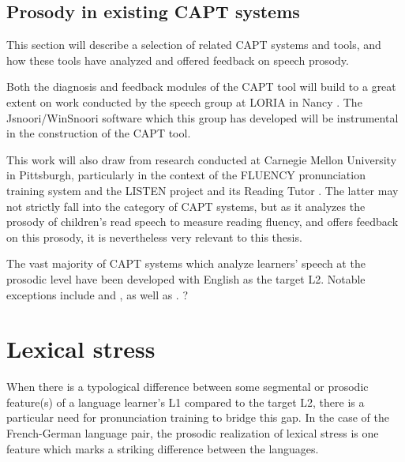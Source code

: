	\subsection{Prosody in existing CAPT systems}
	\label{sec:capt:systems}
	
	This section will describe a selection of related CAPT systems and tools, and how these tools have analyzed and offered feedback on speech prosody.
	
	Both the diagnosis and feedback modules of the CAPT tool will build to a great extent on work conducted by the speech group at LORIA in Nancy \citep{Bonneau2011,Fohr1996,Fohr2012,Mesbahi2011,Orosanu2012}. The Jsnoori/WinSnoori software \citep{Parole2013} %
which this group has developed will be instrumental in the construction of the CAPT tool. 
	
	This work will also draw from research conducted at Carnegie Mellon University in Pittsburgh, particularly in the context of the FLUENCY pronunciation training system \cite{Eskenazi1998,Probst2002} and the LISTEN project and its Reading Tutor \citep{Duong2011,Mostow2012,Mostow1999,Sitaram2011,Weber2010}. The latter may not strictly fall into the category of CAPT systems, but as it analyzes the prosody of children's read speech to measure reading fluency, and offers feedback on this prosody, it is nevertheless very relevant to this thesis.
	
	The vast majority of CAPT systems which analyze learners' speech at the prosodic level have been developed with English as the target L2. Notable exceptions include  and , as well as . ?
	
	
	
 \section{Lexical stress}
 \label{sec:bkgd:stress}
		When there is a typological difference between some segmental or prosodic feature(s) of a language learner's L1 compared to the target L2, there is a particular need for pronunciation training to bridge this gap. In the case of the French-German language pair, the prosodic realization of lexical stress is one feature which marks a striking difference between the languages.
		
